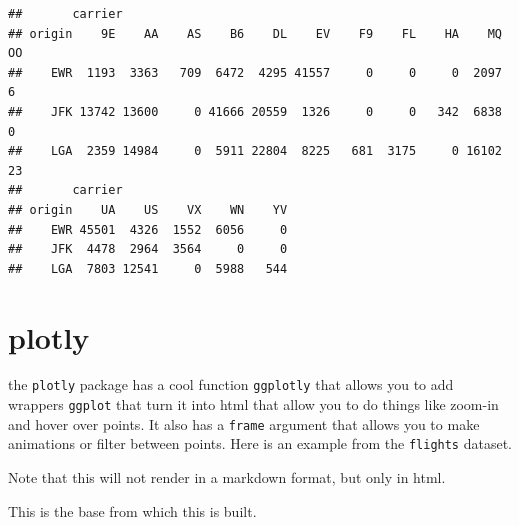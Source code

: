 \documentclass[]{book}
\newenvironment{Shaded}{\begin{snugshade}}{\end{snugshade}}
\newcommand{\DataTypeTok}[1]{\textcolor[rgb]{0.13,0.29,0.53}{#1}}
\newcommand{\KeywordTok}[1]{\textcolor[rgb]{0.13,0.29,0.53}{\textbf{#1}}}
\newcommand{\NormalTok}[1]{#1}
\newcommand{\OperatorTok}[1]{\textcolor[rgb]{0.81,0.36,0.00}{\textbf{#1}}}
\newcommand{\OtherTok}[1]{\textcolor[rgb]{0.56,0.35,0.01}{#1}}
\newcommand{\StringTok}[1]{\textcolor[rgb]{0.31,0.60,0.02}{#1}}
\theoremstyle{definition}
\theoremstyle{definition}
\theoremstyle{definition}
\theoremstyle{remark}
\begin{document}
\begin{verbatim}
##       carrier
## origin    9E    AA    AS    B6    DL    EV    F9    FL    HA    MQ    OO
##    EWR  1193  3363   709  6472  4295 41557     0     0     0  2097     6
##    JFK 13742 13600     0 41666 20559  1326     0     0   342  6838     0
##    LGA  2359 14984     0  5911 22804  8225   681  3175     0 16102    23
##       carrier
## origin    UA    US    VX    WN    YV
##    EWR 45501  4326  1552  6056     0
##    JFK  4478  2964  3564     0     0
##    LGA  7803 12541     0  5988   544
\end{verbatim}

\hypertarget{plotly}{%
\section{plotly}\label{plotly}}

the \texttt{plotly} package has a cool function \texttt{ggplotly} that
allows you to add wrappers \texttt{ggplot} that turn it into html that
allow you to do things like zoom-in and hover over points. It also has a
\texttt{frame} argument that allows you to make animations or filter
between points. Here is an example from the \texttt{flights} dataset.

Note that this will not render in a markdown format, but only in html.

\begin{Shaded}
\end{Shaded}

This is the base from which this is built.
\end{document}
